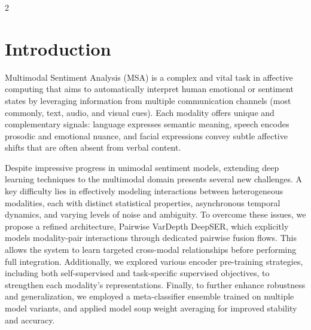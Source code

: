 \documentclass[10pt]{article}
\begin{document}
\begin{multicols}{2}

\section{Introduction}
\par Multimodal Sentiment Analysis (MSA) is a complex and vital task in affective computing that aims to automatically interpret human emotional or sentiment states by leveraging information from multiple communication channels (most commonly, text, audio, and visual cues). Each modality offers unique and complementary signals: language expresses semantic meaning, speech encodes prosodic and emotional nuance, and facial expressions convey subtle affective shifts that are often absent from verbal content.
\par Despite impressive progress in unimodal sentiment models, extending deep learning techniques to the multimodal domain presents several new challenges. A key difficulty lies in effectively modeling interactions between heterogeneous modalities, each with distinct statistical properties, asynchronous temporal dynamics, and varying levels of noise and ambiguity. To overcome these issues, we propose a refined architecture, Pairwise VarDepth DeepSER, which explicitly models modality-pair interactions through dedicated pairwise fusion flows. This allows the system to learn targeted cross-modal relationships before performing full integration. Additionally, we explored various encoder pre-training strategies, including both self-supervised and task-specific supervised objectives, to strengthen each modality’s representations. Finally, to further enhance robustness and generalization, we employed a meta-classifier ensemble trained on multiple model variants, and applied model soup weight averaging for improved stability and accuracy.


\end{multicols}
\end{document}
